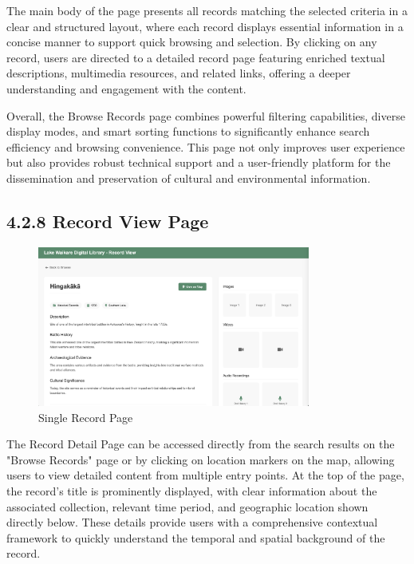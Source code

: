 The main body of the page presents all records matching the selected criteria in a clear and structured layout, where each record displays essential information in a concise manner to support quick browsing and selection. By clicking on any record, users are directed to a detailed record page featuring enriched textual descriptions, multimedia resources, and related links, offering a deeper understanding and engagement with the content.

Overall, the Browse Records page combines powerful filtering capabilities, diverse display modes, and smart sorting functions to significantly enhance search efficiency and browsing convenience. This page not only improves user experience but also provides robust technical support and a user-friendly platform for the dissemination and preservation of cultural and environmental information.

\subsection*{4.2.8 Record View Page}
\begin{figure}[H]
    \centering
    \includegraphics[width=0.8\textwidth]{screenshot/prototype_single_record.png}
    \caption{Single Record Page}
    \label{fig:architecture}
\end{figure}

The Record Detail Page can be accessed directly from the search results on the "Browse Records" page or by clicking on location markers on the map, allowing users to view detailed content from multiple entry points. At the top of the page, the record's title is prominently displayed, with clear information about the associated collection, relevant time period, and geographic location shown directly below. These details provide users with a comprehensive contextual framework to quickly understand the temporal and spatial background of the record.


